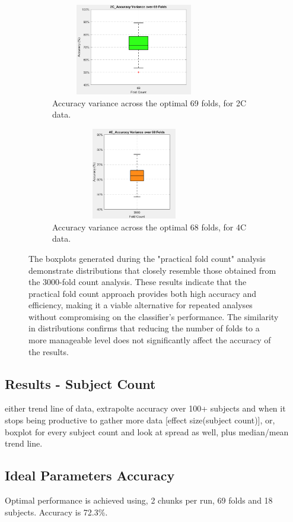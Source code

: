 \begin{figure}[htbp]
 	\centering
	\begin{subfigure}{0.49\textwidth}
		\centering
		\includegraphics[width = 0.8\textwidth, height = 4cm]{assets/images/box_2C_69.png}
		\caption{Accuracy variance across the optimal 69 folds, for \gls{2C} data.}
		\label{fig:2C_69}
	\end{subfigure}
	\hfill
	\begin{subfigure}{0.49\textwidth}
		\centering
	 	\includegraphics[width = 0.8\textwidth, height = 4cm]{assets/images/box_4C_68.png}
		\caption{Accuracy variance across the optimal 68 folds, for \gls{4C} data.}
		\label{fig:4C_68}
	\end{subfigure}
	\caption[Boxplots of Accuracies at optimal Fold Count]{The boxplots generated during the "practical fold count" analysis demonstrate distributions that closely resemble those obtained from the 3000-fold count analysis. These results indicate that the practical fold count approach provides both high accuracy and efficiency, making it a viable alternative for repeated analyses without compromising on the classifier's performance. The similarity in distributions confirms that reducing the number of folds to a more manageable level does not significantly affect the accuracy of the results.}
 	\label{fig:fold}
\end{figure}

\subsection{Results - Subject Count}

either trend line of data, extrapolte accuracy over 100+ subjects and when it stops being productive to gather more data [effect size(subject count)],
or, boxplot for every subject count and look at spread as well, plus median/mean trend line.

\subsection{Ideal Parameters Accuracy}

Optimal performance is achieved using, 2 chunks per run, 69 folds and 18 subjects. Accuracy is 72.3\%.